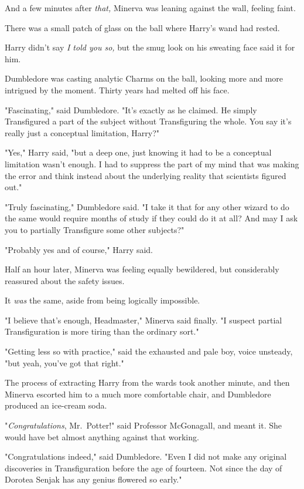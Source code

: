 And a few minutes after \emph{that,} Minerva was leaning against the wall,
feeling faint.

There was a small patch of glass on the ball where Harry's wand had rested.

Harry didn't say \emph{I told you so,} but the smug look on his sweating face
said it for him.

Dumbledore was casting analytic Charms on the ball, looking more and more
intrigued by the moment. Thirty years had melted off his face.

"Fascinating," said Dumbledore. "It's exactly as he claimed. He simply
Transfigured a part of the subject without Transfiguring the whole. You say
it's really just a conceptual limitation, Harry?"

"Yes," Harry said, "but a deep one, just knowing it had to be a conceptual
limitation wasn't enough. I had to suppress the part of my mind that was making
the error and think instead about the underlying reality that scientists
figured out."

"Truly fascinating," Dumbledore said. "I take it that for any other wizard to
do the same would require months of study if they could do it at all? And may I
ask you to partially Transfigure some other subjects?"

"Probably yes and of course," Harry said.

Half an hour later, Minerva was feeling equally bewildered, but considerably
reassured about the safety issues.

It \emph{was} the same, aside from being logically impossible.

"I believe that's enough, Headmaster," Minerva said finally. "I suspect partial
Transfiguration is more tiring than the ordinary sort."

"Getting less so with practice," said the exhausted and pale boy, voice
unsteady, "but yeah, you've got that right."

The process of extracting Harry from the wards took another minute, and then
Minerva escorted him to a much more comfortable chair, and Dumbledore produced
an ice-cream soda.

"\emph{Congratulations}, Mr.~Potter!" said Professor McGonagall, and meant it.
She would have bet almost anything against that working.

"Congratulations indeed," said Dumbledore. "Even I did not make any original
discoveries in Transfiguration before the age of fourteen. Not since the day of
Dorotea Senjak has any genius flowered so early."

